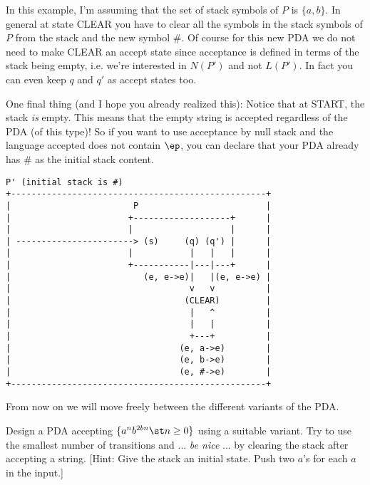 In this example, I'm assuming that the set of stack symbols of $P$ is
$\{a, b\}$.
In general at state CLEAR you have to clear all the symbols in the stack
symbols of $P$ from the stack and the new symbol \#.
Of course for this new PDA we do not need to make CLEAR an accept state since
acceptance is defined in terms of the stack being empty, i.e. we're
interested in $N(P')$ and not $L(P')$.
In fact you can even keep $q$ and $q'$ as accept states too.

One final thing (and I hope you already realized this): 
Notice that at START, the stack \textit{ is} empty.
This means that the empty string is accepted regardless of the PDA (of this
type)!
So if you want to use acceptance by null stack and the language accepted
does not contain $\ep$, you can declare that your PDA already has \# as the 
initial stack content.

\begin{samepage}
\begin{verbatim}
P' (initial stack is #)
+--------------------------------------------------+
|                        P                         |
|                       +-------------------+      |
|                       |                   |      |
| -----------------------> (s)     (q) (q') |      |
|                       |           |   |   |      |
|                       +-----------|---|---+      |
|                          (e, e->e)|   |(e, e->e) |
|                                   v   v          |
|                                  (CLEAR)         |
|                                   |   ^          |
|                                   |   |          |
|                                   +---+          |
|                                 (e, a->e)        |
|                                 (e, b->e)        |
|                                 (e, #->e)        |
+--------------------------------------------------+
\end{verbatim}
\end{samepage}

From now on we will move freely between the different variants of the PDA.

\begin{ex}
Design a PDA accepting $\{ a^n b^{2bn} \st n \geq 0 \}$ using a suitable
variant.
Try to use the smallest number of transitions and ... \textit{ be nice} ...
by clearing the stack after accepting a string.
[Hint: Give the stack an initial state.
Push two $a$'s for each $a$ in the input.]
\end{ex}

